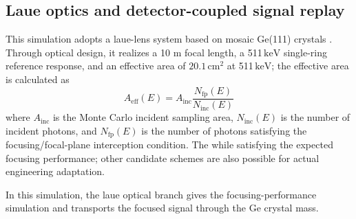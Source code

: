 \documentclass[11pt]{article}
\newcommand{\keV}{\ensuremath{\,\mathrm{keV}}}
\begin{document}
\FloatBarrier

\subsection{Laue optics and detector-coupled signal replay}
\label{sec:optics}

This simulation adopts a laue-lens system based on mosaic Ge(111) crystals \cite{Barriere2009Laue,Barriere2011LauePrototype}. Through optical design, it realizes a 10 m focal length, a 511\keV{} single-ring reference response, and an effective area of $20.1\,\mathrm{cm^2}$ at 511\keV; the effective area is calculated as
\begin{equation}
  A_{\mathrm{eff}}(E)=A_{\mathrm{inc}}\frac{N_{\mathrm{fp}}(E)}{N_{\mathrm{inc}}(E)}
  \label{eq:laue_aeff}
\end{equation}
where $A_{\mathrm{inc}}$ is the Monte Carlo incident sampling area, $N_{\mathrm{inc}}(E)$ is the number of incident photons, and $N_{\mathrm{fp}}(E)$ is the number of photons satisfying the focusing/focal-plane interception condition.
The  while satisfying the expected focusing performance; other candidate schemes are also possible for actual engineering adaptation.

In this simulation, the laue optical branch gives the focusing-performance simulation and transports the focused signal through the Ge crystal mass.
\end{document}
